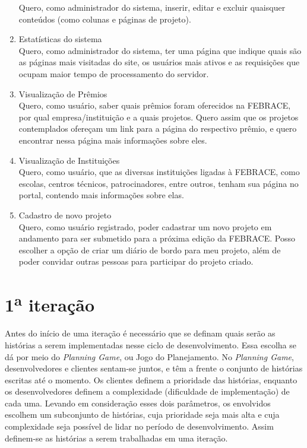 \documentclass[a4paper,12pt,font=plain,header=plain]{abnt}
\begin{document}
\begin{enumerate}
		Quero, como administrador do sistema, inserir, editar e excluir quaisquer conteúdos (como colunas e páginas de projeto).
	 \item Estatísticas do sistema \\
		Quero, como administrador do sistema, ter uma página que indique quais são as páginas mais visitadas do site, os usuários mais ativos e as requisições que ocupam maior tempo de processamento do servidor.
	 \item Visualização de Prêmios \\
		Quero, como usuário, saber quais prêmios foram oferecidos na FEBRACE, por qual empresa/instituição e a quais projetos. Quero assim que os projetos contemplados ofereçam um link para a página do respectivo prêmio, e quero encontrar nessa página mais informações sobre eles.
	 \item Visualização de Instituições \\
		Quero, como usuário, que as diversas instituições ligadas à FEBRACE, como escolas, centros técnicos, patrocinadores, entre outros, tenham sua página no portal, contendo mais informações sobre elas.
	 \item Cadastro de novo projeto \\
		Quero, como usuário registrado, poder cadastrar um novo projeto em andamento para ser submetido para a próxima edição da FEBRACE. Posso escolher a opção de criar um diário de bordo para meu projeto, além de poder convidar outras pessoas para participar do projeto criado.
	\end{enumerate}

  \section{1\textsuperscript{a} iteração}
    Antes do início de uma iteração é necessário que se definam quais serão as histórias a serem implementadas nesse ciclo de desenvolvimento. Essa escolha se dá por meio do \textit{Planning Game}, ou Jogo do Planejamento. No \textit{Planning Game}, desenvolvedores e clientes sentam-se juntos, e têm a frente o conjunto de histórias escritas até o momento. Os clientes definem a prioridade das histórias, enquanto os desenvolvedores definem a complexidade (dificuldade de implementação) de cada uma. Levando em consideração esses dois parâmetros, os envolvidos escolhem um subconjunto de histórias, cuja prioridade seja mais alta e cuja complexidade seja possível de lidar no período de desenvolvimento. Assim definem-se as histórias a serem trabalhadas em uma iteração.
\end{document}

